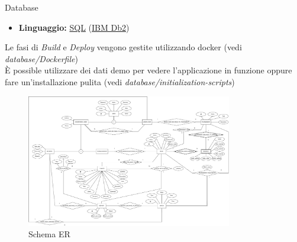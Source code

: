 \documentclass[10pt]{beamer}
\begin{document}
\begin{frame}[allowframebreaks]{Database}
	
	\begin{itemize}

		\item
		\textbf{Linguaggio:} \href{https://www.w3schools.com/sql}{SQL} (\href{https://www.ibm.com/db2}{IBM Db2})

	\end{itemize}
	
	Le fasi di \emph{Build} e \emph{Deploy} vengono gestite utilizzando docker (vedi \emph{database/Dockerfile})\\
	È possible utilizzare dei dati demo per vedere l’applicazione in funzione oppure fare un’installazione pulita (vedi \emph{database/initialization-scripts})

\framebreak

	\begin{figure}
		\includegraphics[width=0.8\textwidth]
		{../images/database-er-diagram}
		
		\caption{Schema ER}
	\end{figure}

\end{frame}
\end{document}

